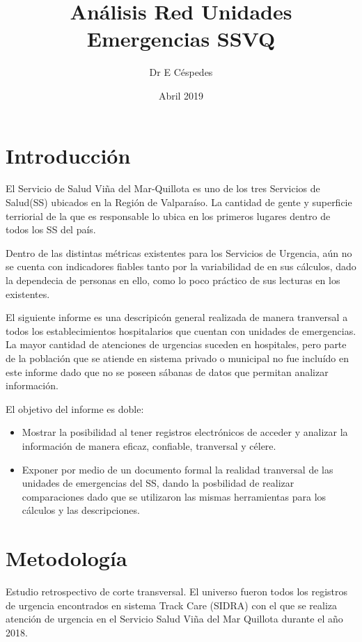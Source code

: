 \documentclass{article}
\title{Análisis Red Unidades Emergencias SSVQ}
\author{Dr E Céspedes}
\date{Abril 2019}
\begin{document}
\maketitle


\tableofcontents

\section{Introducción}
El Servicio de Salud Viña del Mar-Quillota es uno de los tres Servicios de Salud(SS) ubicados en la Región de Valparaíso. La cantidad de gente y superficie terriorial de la que es responsable lo ubica en los primeros lugares dentro de todos los SS del país.

Dentro de las distintas métricas existentes para los Servicios de Urgencia, aún no se cuenta con indicadores fiables tanto por la variabilidad de en sus cálculos, dado la dependecia de personas en ello, como lo poco práctico de sus lecturas en los existentes.

El siguiente informe es una descripicón general realizada de manera tranversal a todos los establecimientos hospitalarios que cuentan con unidades de emergencias. La mayor cantidad de atenciones de urgencias suceden en hospitales, pero parte de la población que se atiende en sistema privado o municipal no fue incluído en este informe dado que no se poseen sábanas de datos que permitan analizar información.

El objetivo del informe es doble: 
\begin{itemize}
\item Mostrar la posibilidad al tener registros electrónicos de acceder y analizar la información de manera eficaz, confiable, tranversal y célere.
\item Exponer por medio de un documento formal la realidad tranversal de las unidades de emergencias del SS, dando la posbilidad de realizar comparaciones dado que se utilizaron las mismas herramientas para los cálculos y las descripciones.
\end{itemize}



\section{Metodología}
Estudio retrospectivo de corte transversal. El universo fueron todos los registros de urgencia encontrados en sistema Track Care (SIDRA) con el que se realiza atención de urgencia en el Servicio Salud Viña del Mar Quillota durante el año 2018.
\end{document}
